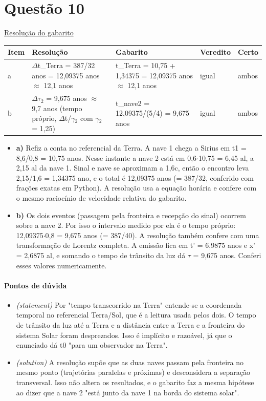 \documentclass{article}%
\begin{document}
\section*{Questão 10}%
\href{https://poliedroresolve.sistemapoliedro.com.br/vestibulares/ita/2026/ita-2-fase-dia-3-30-10-2025-2-fase-dia-3/dissertativa-10-fisica-2-fase-dia-3-ita-2026}{Resolução do gabarito}\par\smallskip%
\begin{longtable}{@{}p{} p{} p{} p{} p{}@{}}\toprule Item & Resolução & Gabarito & Veredito & Certo \\ \midrule
a & $\Delta$t\_Terra = 387/32 anos = 12,09375 anos $\approx$ 12,1 anos & t\_Terra = 10,75 + 1,34375 = 12,09375 anos $\approx$ 12,1 anos & igual & ambos \\
b & $\Delta$$\tau$$_{2}$ = 9,675 anos $\approx$ 9,7 anos (tempo próprio, $\Delta$t/$\gamma$$_{2}$ com $\gamma$$_{2}$ = 1,25) & t\_nave2 = 12,09375/(5/4) = 9,675 anos & igual & ambos \\
\bottomrule\end{longtable}%
\begin{itemize}%
\item%
\textbf{a)} Refiz a conta no referencial da Terra. A nave 1 chega a Sirius em t1 = 8,6/0,8 = 10,75 anos. Nesse instante a nave 2 está em 0,6$\cdot$10,75 = 6,45 al, a 2,15 al da nave 1. Sinal e nave se aproximam a 1,6c, então o encontro leva 2,15/1,6 = 1,34375 ano, e o total é 12,09375 anos (= 387/32, conferido com frações exatas em Python). A resolução usa a equação horária e confere com o mesmo raciocínio de velocidade relativa do gabarito.%
\item%
\textbf{b)} Os dois eventos (passagem pela fronteira e recepção do sinal) ocorrem sobre a nave 2. Por isso o intervalo medido por ela é o tempo próprio: 12,09375$\cdot$0,8 = 9,675 anos (= 387/40). A resolução também confere com uma transformação de Lorentz completa. A emissão fica em t' = 6,9875 anos e x' = 2,6875 al, e somando o tempo de trânsito da luz dá $\tau$ = 9,675 anos. Conferi esses valores numericamente.%
\end{itemize}%
\paragraph{Pontos de dúvida}%
\begin{itemize}%
\item%
\textit{(statement)} Por "tempo transcorrido na Terra" entende{-}se a coordenada temporal no referencial Terra/Sol, que é a leitura usada pelos dois. O tempo de trânsito da luz até a Terra e a distância entre a Terra e a fronteira do sistema Solar foram desprezados. Isso é implícito e razoável, já que o enunciado dá t0 "para um observador na Terra".%
\item%
\textit{(solution)} A resolução supõe que as duas naves passam pela fronteira no mesmo ponto (trajetórias paralelas e próximas) e desconsidera a separação transversal. Isso não altera os resultados, e o gabarito faz a mesma hipótese ao dizer que a nave 2 "está junto da nave 1 na borda do sistema solar".%
\end{itemize}%
\end{document}
